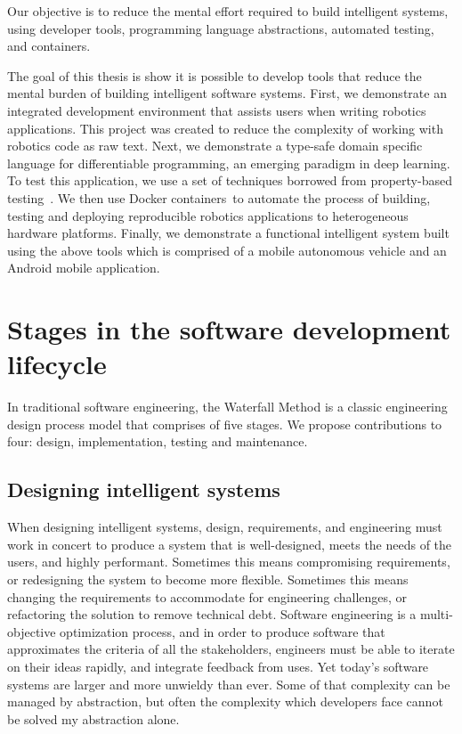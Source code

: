 \documentclass[12pt,initial,twoside,maitrise]{dms}
\numberwithin{equation}{section}
\numberwithin{table}{chapter}
\numberwithin{figure}{chapter}
\begin{document}
Our objective is to reduce the mental effort required to build intelligent systems, using developer tools, programming language abstractions, automated testing, and containers.

The goal of this thesis is show it is possible to develop tools that reduce the mental burden of building intelligent software systems. First, we demonstrate an integrated development environment that assists users when writing robotics applications. This project was created to reduce the complexity of working with robotics code as raw text. Next, we demonstrate a type-safe domain specific language for differentiable programming, an emerging paradigm in deep learning. To test this application, we use a set of techniques borrowed from property-based testing~\cite{fink1997property}. We then use Docker containers~\cite{merkel2014docker}to automate the process of building, testing and deploying reproducible robotics applications to heterogeneous hardware platforms. Finally, we demonstrate a functional intelligent system built using the above tools which is comprised of a mobile autonomous vehicle and an Android mobile application.

\section{Stages in the software development lifecycle}\label{sec:sldc-stages}

In traditional software engineering, the Waterfall Method is a classic engineering design process model that comprises of five stages. We propose contributions to four: design, implementation, testing and maintenance.

\subsection{Designing intelligent systems}

When designing intelligent systems, design, requirements, and engineering must work in concert to produce a system that is well-designed, meets the needs of the users, and highly performant. Sometimes this means compromising requirements, or redesigning the system to become more flexible. Sometimes this means changing the requirements to accommodate for engineering challenges, or refactoring the solution to remove technical debt. Software engineering is a multi-objective optimization process, and in order to produce software that approximates the criteria of all the stakeholders, engineers must be able to iterate on their ideas rapidly, and integrate feedback from uses. Yet today's software systems are larger and more unwieldy than ever. Some of that complexity can be managed by abstraction, but often the complexity which developers face cannot be solved my abstraction alone.
\end{document}
